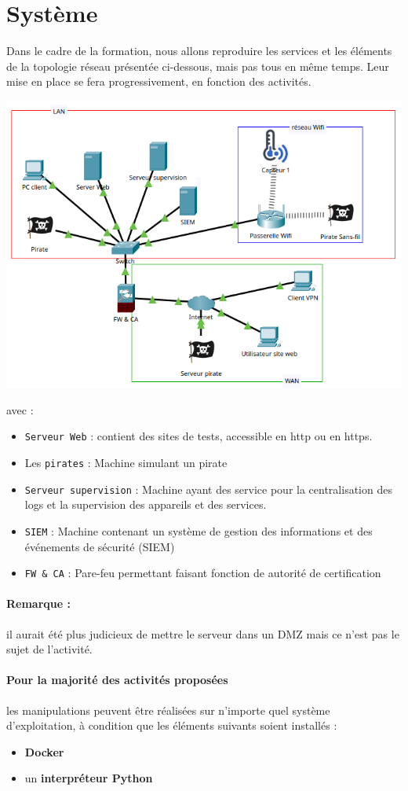 \documentclass[french, 12pt]{article}%
\newcommand{\itemE}{\item[$\bullet$]}
\begin{document}
\section{Système} 

Dans le cadre de la formation, nous allons reproduire les services et les éléments de la topologie réseau présentée ci-dessous, mais pas tous en même temps. Leur mise en place se fera progressivement, en fonction des activités.

\begin{center}
\includegraphics[scale=0.7]{./ressource/environnement.png}
\end{center}
avec : 
\begin{itemize}
\itemE \verb?Serveur Web? : contient des sites de tests, accessible en http ou en https. 
\itemE Les \verb?pirates? : Machine simulant un pirate
\itemE \verb?Serveur supervision? : Machine ayant des service pour la centralisation des logs et la supervision des appareils et des services. 
\itemE \verb?SIEM? : Machine contenant un système de gestion des informations et des événements de sécurité (SIEM)
\itemE \verb?FW & CA? : Pare-feu permettant faisant fonction de autorité de certification
\end{itemize}

\paragraph{Remarque :} il aurait été plus judicieux de mettre le serveur dans un DMZ mais ce n'est pas le sujet de l'activité.  


\paragraph{Pour la majorité des activités proposées} les manipulations peuvent être réalisées sur n'importe quel système d'exploitation, à condition que les éléments suivants soient installés :
\begin{itemize}
  \itemE \textbf{Docker}
  \itemE un \textbf{interpréteur Python}
\end{itemize}
\end{document}

